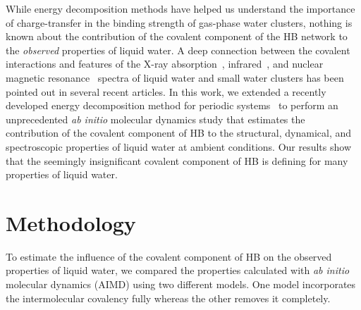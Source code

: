 \documentclass[journal=jacsat,manuscript=article]{achemso}
\begin{document}

While energy decomposition methods have helped us understand the importance of charge-transfer in the binding strength of gas-phase water clusters, nothing is known about the contribution of the covalent component of the HB network to the \emph{observed} properties of liquid water. 
A deep connection between the covalent interactions and features of the X-ray absorption~\cite{fransson2016x, NatureComm2013}, infrared~\cite{JPCL2013,Faraday2011,lenz2006theoretical,auer2008ir}, and nuclear magnetic resonance~\cite{NatureComm2015} spectra of liquid water and small water clusters has been pointed out in several recent articles. 
In this work, we extended a recently developed energy decomposition method for periodic systems~\cite{Khaliullin2013JCTC} to perform an unprecedented \emph{ab initio} molecular dynamics study that estimates the contribution of the covalent component of HB to the structural, dynamical, and spectroscopic properties of liquid water at ambient conditions. 
Our results show that the seemingly insignificant covalent component of HB is defining for many properties of liquid water. 
%

\section{Methodology}


To estimate the influence of the covalent component of HB on the observed properties of liquid water, we compared the properties calculated with \emph{ab initio} molecular dynamics (AIMD) using two different models. 
One model incorporates the intermolecular covalency fully whereas the other removes it completely.
\end{document}
